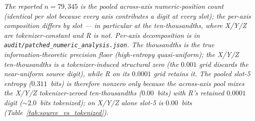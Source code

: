 \begin{table}[ht]
\begin{tabular}{c l r r r}
\bottomrule
\end{tabular}
\par\smallskip
\footnotesize\textit{The reported $n=79{,}345$ is the pooled across-axis numeric-position count (identical per slot because every axis contributes a digit at every slot); the per-axis composition differs by slot --- in particular at the ten-thousandths, where X/Y/Z are tokenizer-constant and R is not. Per-axis decomposition is in \texttt{audit/patched\_numeric\_analysis.json}. The thousandths is the true information-theoretic precision floor (high-entropy quasi-uniform); the X/Y/Z ten-thousandths is a tokenizer-induced structural zero (the $0.001$ grid discards the near-uniform source digit), while R on its $0.0001$ grid retains it. The pooled slot-5 entropy ($0.311$~bits) is therefore nonzero only because the across-axis pool mixes the X/Y/Z tokenizer-zeroed ten-thousandths ($0.00$~bits) with R's retained $0.0001$ digit ($\sim\!2.0$~bits tokenized); on X/Y/Z alone slot-5 is $0.00$~bits (Table~\ref{tab:source_vs_tokenized}).}
\end{table}

